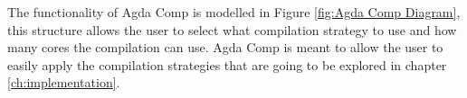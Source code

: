 The functionality of Agda Comp is modelled in Figure \ref{fig:Agda Comp
Diagram}, this structure allows the user to select what compilation strategy to
use and how many cores the compilation can use. Agda Comp is meant to allow the
user to easily apply the compilation strategies that are going to be explored
in chapter \ref{ch:implementation}.

%
